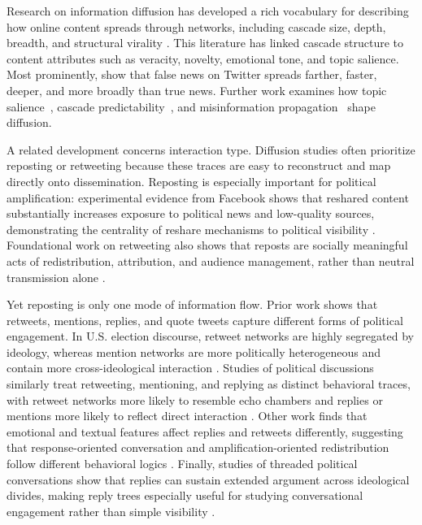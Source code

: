 \documentclass[letterpaper]{article} %
\begin{document}
Research on information diffusion has developed a rich vocabulary for describing how online content spreads through networks, including cascade size, depth, breadth, and structural virality \cite{gruhl_information_2004, guille_information_2013, easley_networks_2010, goel_structural_2016}. This literature has linked cascade structure to content attributes such as veracity, novelty, emotional tone, and topic salience. Most prominently, \citet{vosoughi_spread_2018} show that false news on Twitter spreads farther, faster, deeper, and more broadly than true news. Further work examines how topic salience~\cite{wang_factors_2022}, cascade predictability~\cite{cheng_can_2014}, and misinformation propagation~\cite{zhao_fake_2020} shape diffusion.

A related development concerns interaction type. Diffusion studies often prioritize reposting or retweeting because these traces are easy to reconstruct and map directly onto dissemination. Reposting is especially important for political amplification: experimental evidence from Facebook shows that reshared content substantially increases exposure to political news and low-quality sources, demonstrating the centrality of reshare mechanisms to political visibility \cite{guess_reshare_2023}. Foundational work on retweeting also shows that reposts are socially meaningful acts of redistribution, attribution, and audience management, rather than neutral transmission alone \cite{boyd_tweet_2010, park_expanding_2019}. 

Yet reposting is only one mode of information flow. Prior work shows that retweets, mentions, replies, and quote tweets capture different forms of political engagement. In U.S. election discourse, retweet networks are highly segregated by ideology, whereas mention networks are more politically heterogeneous and contain more cross-ideological interaction \cite{conover_political_2011}. Studies of political discussions similarly treat retweeting, mentioning, and replying as distinct behavioral traces, with retweet networks more likely to resemble echo chambers and replies or mentions more likely to reflect direct interaction \cite{guerrero_sole_interactive_2018}. Other work finds that emotional and textual features affect replies and retweets differently, suggesting that response-oriented conversation and amplification-oriented redistribution follow different behavioral logics \cite{kim_role_2012, toraman_understanding_2022}. Finally, studies of threaded political conversations show that replies can sustain extended argument across ideological divides, making reply trees especially useful for studying conversational engagement rather than simple visibility \cite{shugars_why_2019}.
\end{document}
